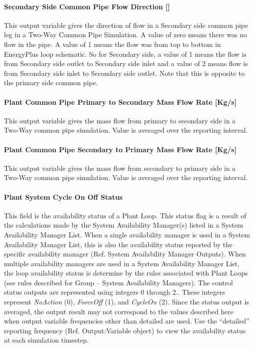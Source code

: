 \paragraph{Secondary Side Common Pipe Flow Direction {[]}}\label{secondary-side-common-pipe-flow-direction}

This output variable gives the direction of flow in a Secondary side common pipe leg in a Two-Way Common Pipe Simulation. A value of zero means there was no flow in the pipe. A value of 1 means the flow was from top to bottom in EnergyPlus loop schematic. So for Secondary side, a value of 1 means the flow is from Secondary side outlet to Secondary side inlet and a value of 2 means flow is from Secondary side inlet to Secondary side outlet. Note that this is opposite to the primary side common pipe.

\paragraph{Plant Common Pipe Primary to Secondary Mass Flow Rate {[}Kg/s{]}}\label{plant-common-pipe-primary-to-secondary-mass-flow-rate-kgs}

This output variable gives the mass flow from primary to secondary side in a Two-Way common pipe simulation. Value is averaged over the reporting interval.

\paragraph{Plant Common Pipe Secondary to Primary Mass Flow Rate {[}Kg/s{]}}\label{plant-common-pipe-secondary-to-primary-mass-flow-rate-kgs}

This output variable gives the mass flow from secondary to primary side in a Two-Way common pipe simulation. Value is averaged over the reporting interval.

\paragraph{Plant System Cycle On Off Status}\label{plant-system-cycle-on-off-status}

This field is the availability status of a Plant Loop. This status flag is a result of the calculations made by the System Availability Manager(s) listed in a System Availability Manager List. When a single availability manager is used in a System Availability Manager List, this is also the availability status reported by the specific availability manager (Ref. System Availability Manager Outputs). When multiple availability managers are used in a System Availability Manager List, the loop availability status is determine by the rules associated with Plant Loops (see rules described for Group -- System Availability Managers). The control status outputs are represented using integers 0 through 2.. These integers represent \emph{NoAction} (0), \emph{ForceOff} (1), and \emph{CycleOn} (2). Since the status output is averaged, the output result may not correspond to the values described here when output variable frequencies other than detailed are used. Use the ``detailed'' reporting frequency (Ref. Output:Variable object) to view the availability status at each simulation timestep.


